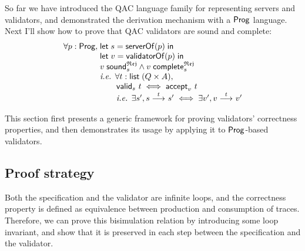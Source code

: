 So far we have introduced the QAC language family for representing servers and
validators, and demonstrated the derivation mechanism with a $\mathsf{Prog}$ language.
Next I'll show how to prove that QAC validators are sound and complete:
\[\begin{array}{r@{\;}l}
\forall p:\Prog,&\letin{s}{\serverOf(p)}\\
&\letin{v}{\validatorOf(p)}\\
&\rejSound v s\wedge\rejComplete v s\\
&\text{\it i.e. }\forall t:\List(Q\times A),\\
&\qquad\valid s t\iff\accepts v t\\
&\qquad\text{\it i.e. }\exists s',\behaves s t s'\iff\exists v',\behaves v t v'
\end{array}\]

This section first presents a generic framework for proving validators'
correctness properties, and then demonstrates its usage by applying it to
$\mathsf{Prog}$-based validators.

\subsection{Proof strategy}
Both the specification and the validator are infinite loops, and the correctness
property is defined as equivalence between production and consumption of traces.
Therefore, we can prove this bisimulation relation by introducing some loop
invariant, and show that it is preserved in each step between the specification
and the validator.

